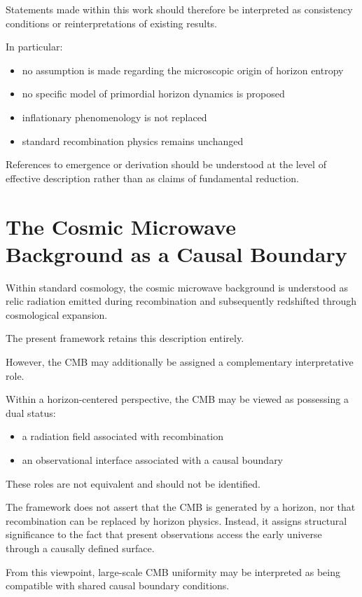 \documentclass[12pt,a4paper]{article}
\begin{document}
Statements made within this work should therefore be interpreted as consistency conditions or reinterpretations of existing results.

In particular:

\begin{itemize}
  \item no assumption is made regarding the microscopic origin of horizon entropy
  \item no specific model of primordial horizon dynamics is proposed
  \item inflationary phenomenology is not replaced
  \item standard recombination physics remains unchanged
\end{itemize}

References to emergence or derivation should be understood at the level of effective description rather than as claims of fundamental reduction.

\section{The Cosmic Microwave Background as a Causal Boundary}

Within standard cosmology, the cosmic microwave background is understood as relic radiation emitted during recombination and subsequently redshifted through cosmological expansion.

The present framework retains this description entirely.

However, the CMB may additionally be assigned a complementary interpretative role.

Within a horizon-centered perspective, the CMB may be viewed as possessing a dual status:

\begin{itemize}
  \item a radiation field associated with recombination
  \item an observational interface associated with a causal boundary
\end{itemize}

These roles are not equivalent and should not be identified.

The framework does not assert that the CMB is generated by a horizon, nor that recombination can be replaced by horizon physics. Instead, it assigns structural significance to the fact that present observations access the early universe through a causally defined surface.

From this viewpoint, large-scale CMB uniformity may be interpreted as being compatible with shared causal boundary conditions.
\end{document}
